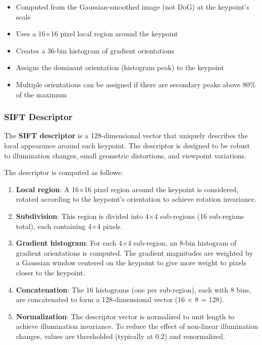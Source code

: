\documentclass[11pt,a4paper]{article}
\theoremstyle{definition}
\theoremstyle{plain}
\theoremstyle{remark}
\begin{document}
\begin{tcolorbox}[colback=yellow!10!white,colframe=yellow!75!black,title=\textbf{Orientation Assignment}]
\begin{itemize}
    \item Computed from the Gaussian-smoothed image (not DoG) at the keypoint's scale
    \item Uses a 16×16 pixel local region around the keypoint
    \item Creates a 36-bin histogram of gradient orientations
    \item Assigns the dominant orientation (histogram peak) to the keypoint
    \item Multiple orientations can be assigned if there are secondary peaks above 80\% of the maximum
\end{itemize}
\end{tcolorbox}

\subsubsection{SIFT Descriptor}

The \textbf{SIFT descriptor} is a 128-dimensional vector that uniquely describes the local appearance around each keypoint. The descriptor is designed to be robust to illumination changes, small geometric distortions, and viewpoint variations.

The descriptor is computed as follows:

\begin{enumerate}
    \item \textbf{Local region}: A 16×16 pixel region around the keypoint is considered, rotated according to the keypoint's orientation to achieve rotation invariance.
    
    \item \textbf{Subdivision}: This region is divided into 4×4 sub-regions (16 sub-regions total), each containing 4×4 pixels.
    
    \item \textbf{Gradient histogram}: For each 4×4 sub-region, an 8-bin histogram of gradient orientations is computed. The gradient magnitudes are weighted by a Gaussian window centered on the keypoint to give more weight to pixels closer to the keypoint.
    
    \item \textbf{Concatenation}: The 16 histograms (one per sub-region), each with 8 bins, are concatenated to form a 128-dimensional vector (16 × 8 = 128).
    
    \item \textbf{Normalization}: The descriptor vector is normalized to unit length to achieve illumination invariance. To reduce the effect of non-linear illumination changes, values are thresholded (typically at 0.2) and renormalized.
\end{enumerate}
\end{document}
